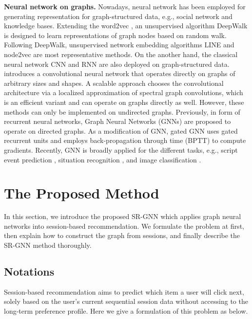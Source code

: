 \documentclass[letterpaper]{article} \usepackage{cite}
\begin{document}
{\bf Neural network on graphs.}
Nowadays, neural network has been employed for generating representation for graph-structured data, e.g., social network and knowledge bases. Extending the word2vec \cite{mikolov2013distributed}, an unsupervised algorithm DeepWalk \cite{Perozzi:2014:DOL:2623330.2623732} is designed to learn representations of graph nodes based on random walk. Following DeepWalk, unsupervised network embedding algorithms LINE \cite{Tang:2015:LLI:2736277.2741093} and node2vec \cite{Grover:2016:NSF:2939672.2939754} are most representative methods. On the another hand, the classical neural network CNN and RNN are also deployed on graph-structured data. \cite{Duvenaud:2015:CNG:2969442.2969488} introduces a convolutional neural network that operates directly on graphs of arbitrary sizes and shapes. A scalable approach \cite{DBLP:journals/corr/KipfW16} chooses the convolutional architecture via a localized approximation of spectral graph convolutions, which is an efficient variant and can operate on graphs directly as well. However, these methods can only be implemented on undirected graphs. Previously, in form of recurrent neural networks, Graph Neural Networks (GNNs) \cite{1555942,4700287} are proposed to operate on directed graphs. As a modification of GNN, gated GNN \cite{DBLP:journals/corr/LiTBZ15} uses gated recurrent units and employs back-propagation through time (BPTT) to compute gradients. Recently, GNN is broadly applied for the different tasks, e.g., script event prediction \cite{EEG2018}, situation recognition \cite{8237710}, and image classification \cite{8099493}.

\section{The Proposed Method}

In this section, we introduce the proposed SR-GNN which applies graph neural networks into session-based recommendation. We formulate the problem at first, then explain how to construct the graph from sessions, and finally describe the SR-GNN method thoroughly.

\subsection{Notations}

Session-based recommendation aims to predict which item a user will click next, solely based on the user's current sequential session data without accessing to the long-term preference profile. Here we give a formulation of this problem as below.
\end{document}
